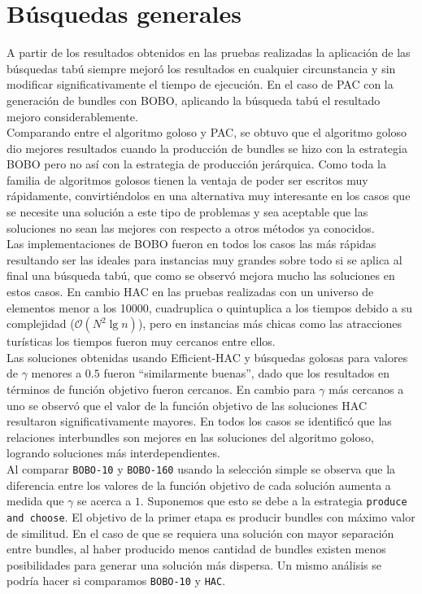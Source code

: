 \section{Búsquedas generales}
A partir de los resultados obtenidos en las pruebas realizadas la aplicación de las búsquedas tabú siempre mejoró los resultados en cualquier circunstancia y sin modificar significativamente el tiempo de ejecución. En el caso de PAC con la generación de bundles con BOBO, aplicando la búsqueda tabú el resultado mejoro considerablemente.\\

Comparando entre el algoritmo goloso y PAC, se obtuvo que el algoritmo goloso dio mejores resultados cuando la producción de bundles se hizo con la estrategia BOBO pero no así con la estrategia de producción jerárquica. Como toda la familia de algoritmos golosos tienen la ventaja de poder ser escritos muy rápidamente, convirtiéndolos en una alternativa muy interesante en los casos que se necesite una solución a este tipo de problemas y sea aceptable que las soluciones no sean las mejores con respecto a otros métodos ya conocidos.\\

Las implementaciones de BOBO fueron en todos los casos las más rápidas resultando ser las ideales para instancias muy grandes sobre todo si se aplica al final una búsqueda tabú, que como se observó mejora mucho las soluciones en estos casos. En cambio HAC en las pruebas realizadas con un universo de elementos menor a los 10000, cuadruplica o quintuplica a los tiempos debido a su complejidad ($\mathcal{O}(N^{2}\lg n)$), pero en instancias más chicas como las atracciones turísticas los tiempos fueron muy cercanos entre ellos.\\

Las soluciones obtenidas usando Efficient-HAC y búsquedas golosas para valores de $\gamma$ menores a $0.5$ fueron \textquotedblleft similarmente buenas\textquotedblright , dado que los resultados en términos de función objetivo fueron cercanos. En cambio para $\gamma$ más cercanos a uno se observó que el valor de la función objetivo de las soluciones HAC resultaron significativamente mayores. En todos los casos se identificó que las relaciones interbundles son mejores en las soluciones del algoritmo goloso, logrando soluciones más interdependientes.\\

Al comparar \texttt{BOBO-10} y \texttt{BOBO-160} usando la selección simple se observa que la diferencia entre los valores de la función objetivo de cada solución aumenta a medida que $\gamma$ se acerca a $1$. Suponemos que esto se debe a la estrategia \texttt{produce and choose}. El objetivo de la primer etapa es producir bundles con máximo valor de similitud. En el caso de que se requiera una solución con mayor separación entre bundles, al haber producido menos cantidad de bundles existen menos posibilidades para generar una solución más dispersa. Un mismo análisis se podría hacer si comparamos \texttt{BOBO-10} y \texttt{HAC}.\\


